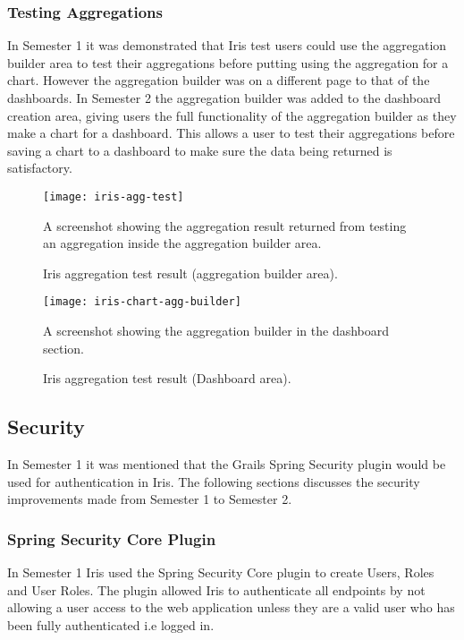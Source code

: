 \documentclass[12pt,a4paper,titlepage]{report}
\begin{document}
\subsubsection{Testing Aggregations}
In Semester 1 it was demonstrated that Iris test users could use the aggregation builder area to test their aggregations before putting using the aggregation for a chart. However the aggregation builder was on a different page to that of the dashboards. In Semester 2 the aggregation builder was added to the dashboard creation area, giving users the full functionality of the aggregation builder as they make a chart for a dashboard. This allows a user to test their aggregations before saving a chart to a dashboard to make sure the data being returned is satisfactory.

\begin{figure}[H]
\begin{tcolorbox}
\begin{center}
\texttt{[image: iris-agg-test]}
\end{center}
A screenshot showing the aggregation result returned from testing an aggregation inside the aggregation builder area.
\end{tcolorbox}
\caption{Iris aggregation test result (aggregation builder area).}
\end{figure}

\begin{figure}[H]
\begin{tcolorbox}
\begin{center}
\texttt{[image: iris-chart-agg-builder]}
\end{center}
A screenshot showing the aggregation builder in the dashboard section.
\end{tcolorbox}
\caption{Iris aggregation test result (Dashboard area).}
\end{figure}
\subsection{Security}
In Semester 1 it was mentioned that the Grails Spring Security plugin would be used for authentication in Iris. The following sections discusses the security improvements made from Semester 1 to Semester 2.

\subsubsection{Spring Security Core Plugin}
In Semester 1 Iris used the Spring Security Core plugin to create Users, Roles and User Roles. The plugin allowed Iris to authenticate all endpoints by not allowing a user access to the web application unless they are a valid user who has been fully authenticated i.e logged in.
\end{document}
